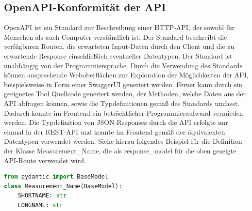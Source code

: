 \subsection{OpenAPI-Konformität der API}
OpenAPI \cite{openapi} ist ein Standard zur Beschreibung einer HTTP-API, der sowohl für 
Menschen als auch Computer verständlich ist. Der Standard beschreibt die verfügbaren Routen, 
die erwarteten Input-Daten durch den Client und die zu erwartende Response einschließlich 
eventueller Datentypen. Der Standard ist unabhängig von der Programmiersprache. Durch die 
Verwendung des Standards können ansprechende Weboberflächen zur Exploration der Möglichkeiten 
der API, beispielsweise in Form einer SwaggerUI generiert werden. Ferner kann durch ein 
geeignetes Tool Quellcode generiert werden, der Methoden, welche Daten aus der API abfragen können, 
sowie die Typdefinitionen gemäß des Standards umfasst. Dadurch konnte im Frontend ein 
beträchtlicher Programmieraufwand vermieden werden. Die Typdefinition von JSON-Responses 
durch die API erfolgte nur einmal in der REST-API und konnte im Frontend gemäß der äquivalenten 
Datentypen verwendet werden. Siehe hierzu folgendes Beispiel für die Definition der Klasse 
Measurement\_Name, die als response\_model für die oben gezeigte API-Route verwendet wird. ~\\

\begin{lstlisting}[language={Python}, caption={Response Model Measurement\_Name}, captionpos=b, label={fig:Response Model}]
from pydantic import BaseModel
class Measurement_Name(BaseModel):
    SHORTNAME: str
    LONGNAME: str
\end{lstlisting}~\\